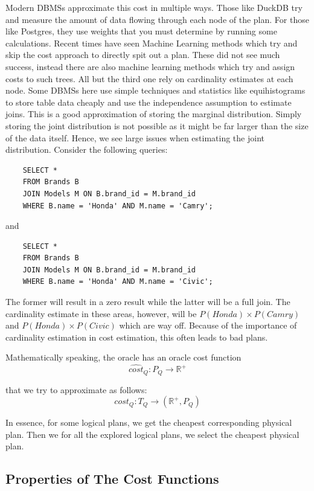 \documentclass[sigconf,nonacm]{acmart}
\begin{document}
Modern DBMSs approximate this cost in multiple ways. Those like DuckDB try and measure the amount of data flowing through each node of the plan. For those like Postgres, they use weights that you must determine by running some calculations. Recent times have seen Machine Learning methods which try and skip the cost approach to directly spit out a plan. These did not see much success, instead there are also machine learning methods which try and assign costs to such trees. All but the third one rely on cardinality estimates at each node. Some DBMSs here use simple techniques and statistics like equihistograms to store table data cheaply and use the independence assumption to estimate joins. This is a good approximation of storing the marginal distribution. Simply storing the joint distribution is not possible as it might be far larger than the size of the data itself. Hence, we see large issues when estimating the joint distribution. Consider the following queries:
\begin{verbatim}
    SELECT *
    FROM Brands B
    JOIN Models M ON B.brand_id = M.brand_id
    WHERE B.name = 'Honda' AND M.name = 'Camry';
\end{verbatim}

and 

\begin{verbatim}
    SELECT *
    FROM Brands B
    JOIN Models M ON B.brand_id = M.brand_id
    WHERE B.name = 'Honda' AND M.name = 'Civic';
\end{verbatim}

The former will result in a zero result while the latter will be a full join. The cardinality estimate in these areas, however, will be $P(Honda)\times P(Camry)$ and $P(Honda)\times P(Civic)$ which are way off. Because of the importance of cardinality estimation in cost estimation, this often leads to bad plans. 

Mathematically speaking, the oracle has an oracle cost function
$$ \hat{cost}_Q: P_Q\to \mathbb{R^+}$$

that we try to approximate as follows:
$$ {cost}_Q: T_Q\to (\mathbb{R^+}, P_Q)$$

In essence, for some logical plans, we get the cheapest corresponding physical plan. Then we for all the explored logical plans, we select the cheapest physical plan. 

\subsection{Properties of The Cost Functions}
\end{document}
